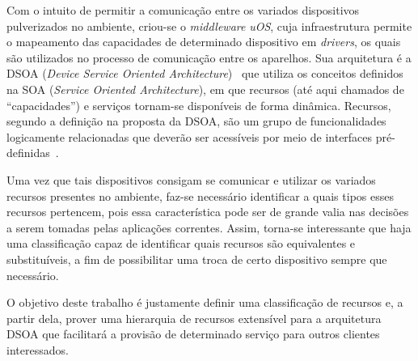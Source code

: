 Com o intuito de permitir a comunicação entre os variados dispositivos pulverizados no ambiente, criou-se o \emph{middleware} \emph{uOS}, cuja infraestrutura permite o mapeamento das capacidades de determinado dispositivo em \emph{drivers}, os quais são utilizados no processo de comunicação entre os aparelhos. Sua arquitetura é a DSOA (\emph{Device Service Oriented Architecture})~\cite{buzetoDSOA2010} que utiliza os conceitos definidos na SOA (\emph{Service Oriented Architecture}), em que recursos (até aqui chamados de ``capacidades'') e serviços tornam-se disponíveis de forma dinâmica. Recursos, segundo a definição na proposta da DSOA, são um grupo de funcionalidades logicamente relacionadas que deverão ser acessíveis por meio de interfaces pré-definidas~\cite{buzeto2010}. 

Uma vez que tais dispositivos consigam se comunicar e utilizar os variados recursos presentes no ambiente, faz-se necessário identificar a quais tipos esses recursos pertencem, pois essa característica pode ser de grande valia nas decisões a serem tomadas pelas aplicações correntes. Assim, torna-se interessante que haja uma classificação capaz de identificar quais recursos são equivalentes e substituíveis, a fim de possibilitar uma troca de certo dispositivo sempre que necessário.

O objetivo deste trabalho é justamente definir uma classificação de recursos e, a partir dela, prover uma hierarquia de recursos extensível para a arquitetura DSOA que facilitará a provisão de determinado serviço para outros clientes interessados.

